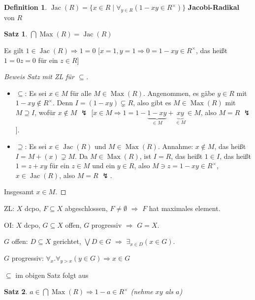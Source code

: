 \documentclass[headsepline=true,DIV=11]{scrartcl}
\newtheorem*{theorem}{Satz}
\theoremstyle{definition}
\newtheorem*{definition}{Definition}
\newenvironment{gelaber}{}{}
\newcommand{\Max}{\operatorname{Max}}
\newcommand{\Jac}{\operatorname{Jac}}
\begin{document}
\begin{definition}
  $\Jac(R) = \{x\in R\mid \forall_{y\in R} (1-xy\in R^\times)\}$ {\bf Jacobi-Radikal} von $R$
\end{definition}

\begin{theorem}
  $\bigcap\Max(R)=\Jac(R)$
\end{theorem}

Es gilt $1\in\Jac(R)\Rightarrow 1=0$ [$x=1,y=1\Rightarrow 0=1-xy\in R^\times$, das heißt $1=0z=0$ für ein $z\in R$]

\begin{proof}[Beweis Satz mit ZL für $\subseteq$]
  $\phantom{a}$

  \begin{itemize}
    \item $\subseteq$: Es sei $x\in M$ für alle $M\in\Max(R)$. Angenommen, es gäbe $y\in R$ mit $1-xy\not\in R^\times$. Denn $I=(1-xy)\subsetneq R$,
      also gibt es $M\in\Max(R)$ mit $M\supseteq I$, wofür $x\not\in M$ $\lightning$ [$x\in M\Rightarrow 1=1-\underbrace{1-xy}_{\in
          M}+\underbrace{xy}_{\in M}\in M$, also $M=R$ $\lightning$].
    \item $\supseteq$: Es sei $x\in\Jac(R)$ und $M\in\Max(R)$. Annahme: $x\not\in M$, das heißt $I=M+(x)\supsetneq M$. Da $M\in\Max(R)$, ist $I=R$,
      das heißt $1\in I$, das heißt $1=z+xy$ für ein $z\in M$ und ein $y\in R$, also $M\ni z=1-xy\in R^\times$, $x\in\Jac(R)$, also $M=R$
      $\lightning$.
  \end{itemize}
  Insgesamt $x\in M$.
\end{proof}

\begin{gelaber}
  ZL: $X$ dcpo, $F\subseteq X$ abgeschlossen, $F\neq\emptyset$ $\Rightarrow$ $F$ hat maximales element.
\end{gelaber}

\begin{gelaber}
  OI: $X$ dcpo, $G\subseteq X$ offen, $G$ progressiv $\Rightarrow$ $G=X$.

  $G$ offen: $D\subseteq X$ gerichtet, $\bigvee D\in G$ $\Rightarrow$
  $\exists_{x\in D}(x\in G)$.

  $G$ progressiv: $\forall_x . \forall_{y>x}(y\in G) \Rightarrow x\in G$
\end{gelaber}

$\subseteq$ im obigen Satz folgt aus

\begin{theorem}
  $a\in\bigcap\Max(R)\Rightarrow 1-a\in R^\times$ (nehme $xy$ als $a$)
\end{theorem}
\end{document}
